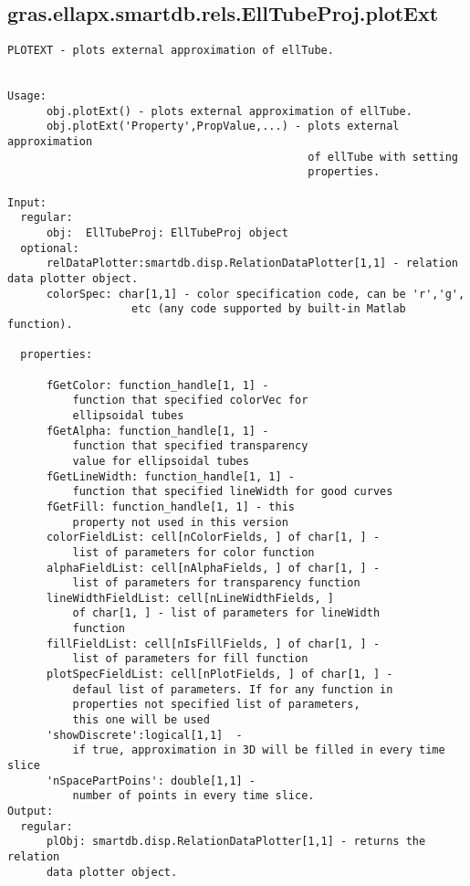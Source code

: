 \subsection{\texorpdfstring{gras.ellapx.smartdb.rels.EllTubeProj.plotExt}{plotExt}}\label{method:gras.ellapx.smartdb.rels.EllTubeProj.plotExt}
\begin{verbatim}
PLOTEXT - plots external approximation of ellTube.


Usage:
      obj.plotExt() - plots external approximation of ellTube.
      obj.plotExt('Property',PropValue,...) - plots external approximation
                                              of ellTube with setting
                                              properties.

Input:
  regular:
      obj:  EllTubeProj: EllTubeProj object
  optional:
      relDataPlotter:smartdb.disp.RelationDataPlotter[1,1] - relation data plotter object.
      colorSpec: char[1,1] - color specification code, can be 'r','g',
                   etc (any code supported by built-in Matlab function).

  properties:

      fGetColor: function_handle[1, 1] -
          function that specified colorVec for
          ellipsoidal tubes
      fGetAlpha: function_handle[1, 1] -
          function that specified transparency
          value for ellipsoidal tubes
      fGetLineWidth: function_handle[1, 1] -
          function that specified lineWidth for good curves
      fGetFill: function_handle[1, 1] - this
          property not used in this version
      colorFieldList: cell[nColorFields, ] of char[1, ] -
          list of parameters for color function
      alphaFieldList: cell[nAlphaFields, ] of char[1, ] -
          list of parameters for transparency function
      lineWidthFieldList: cell[nLineWidthFields, ]
          of char[1, ] - list of parameters for lineWidth
          function
      fillFieldList: cell[nIsFillFields, ] of char[1, ] -
          list of parameters for fill function
      plotSpecFieldList: cell[nPlotFields, ] of char[1, ] -
          defaul list of parameters. If for any function in
          properties not specified list of parameters,
          this one will be used
      'showDiscrete':logical[1,1]  -
          if true, approximation in 3D will be filled in every time slice
      'nSpacePartPoins': double[1,1] -
          number of points in every time slice.
Output:
  regular:
      plObj: smartdb.disp.RelationDataPlotter[1,1] - returns the relation
      data plotter object.
\end{verbatim}

